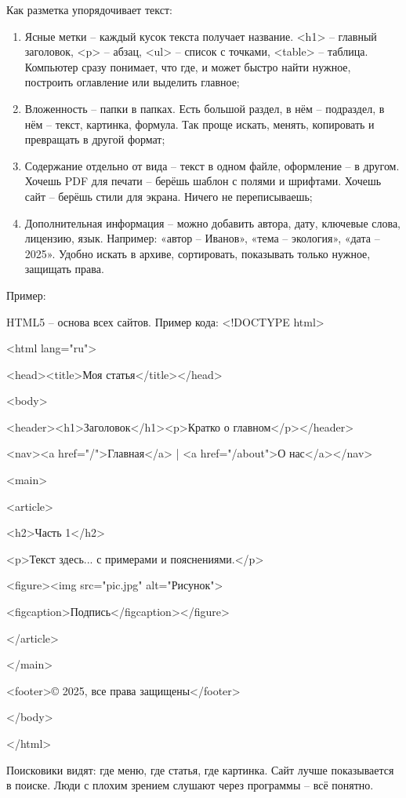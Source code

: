 \documentclass{ou}
\begin{document}
Как разметка упорядочивает текст:
\begin{enumerate}[leftmargin=0em, itemindent=3.75em, nosep, label=\arabic*)]
\item Ясные метки -- каждый кусок текста получает название. <h1> -- главный заголовок, <p> -- абзац, <ul> -- список с точками, <table> -- таблица. Компьютер сразу понимает, что где, и может быстро найти нужное, построить оглавление или выделить главное;
\item Вложенность -- папки в папках. Есть большой раздел, в нём -- подраздел, в нём -- текст, картинка, формула. Так проще искать, менять, копировать и превращать в другой формат;
\item Содержание отдельно от вида -- текст в одном файле, оформление -- в другом. Хочешь PDF для печати -- берёшь шаблон с полями и шрифтами. Хочешь сайт -- берёшь стили для экрана. Ничего не переписываешь;
\item Дополнительная информация -- можно добавить автора, дату, ключевые слова, лицензию, язык. Например: «автор -- Иванов», «тема -- экология», «дата -- 2025». Удобно искать в архиве, сортировать, показывать только нужное, защищать права.
\end{enumerate}

Пример:

HTML5 -- основа всех сайтов. Пример кода:
<!DOCTYPE html>

<html lang="ru">

<head><title>Моя статья</title></head>

<body>

<header><h1>Заголовок</h1><p>Кратко о главном</p></header>

<nav><a href="/">Главная</a> | <a href="/about">О нас</a></nav>

<main>

<article>

<h2>Часть 1</h2>

<p>Текст здесь... с примерами и пояснениями.</p>

<figure><img src="pic.jpg" alt="Рисунок">

<figcaption>Подпись</figcaption></figure>

</article>

</main>

<footer>© 2025, все права защищены</footer>

</body>

</html>

Поисковики видят: где меню, где статья, где картинка. Сайт лучше показывается в поиске. Люди с плохим зрением слушают через программы -- всё понятно.
\end{document}
